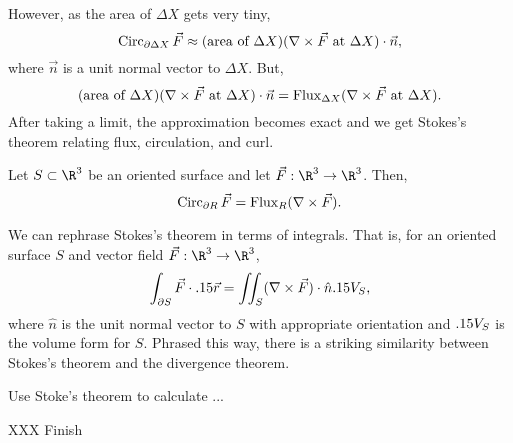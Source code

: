 However, as the area of $\Delta X$ gets very tiny,
\[
	\operatorname{Circ}_{\partial \Delta X} \vec F \approx (\text{area of }\Delta X)(\nabla \times \vec F
	\text{ at }\Delta X)\cdot \vec n,
\]
where $\vec n$ is a unit normal vector to $\Delta X$.  But, 
\[ 
	(\text{area of }\Delta X)(\nabla \times \vec F
	\text{ at }\Delta X)\cdot \vec n = \operatorname{Flux}_{\Delta X}(\nabla \times \vec F\text{ at }\Delta X).
\]
After taking a limit, the approximation becomes exact and we get Stokes's theorem
relating flux, circulation, and curl.

\begin{theorem}
	Let $S\subset \R^3$ be an oriented surface and let $\vec F:\R^3\to\R^3$.  Then,
	\[
		\operatorname{Circ}_{\partial R} \vec F = \operatorname{Flux}_{R}(\nabla \times \vec F).
	\]
\end{theorem}

We can rephrase Stokes's theorem in terms of integrals.  That is, for an oriented
surface $S$ and vector field $\vec F:\R^3\to\R^3$,
\[
	\int_{\partial S} \vec F\cdot .15\vec r = \iint_S (\nabla \times \vec F)\cdot
	\hat n.15 V_S,
\]
where $\hat n$ is the unit normal vector to $S$ with appropriate orientation and 
$.15 V_S$ is the volume form for $S$.  Phrased this way, there is a striking similarity
between Stokes's theorem and the divergence theorem.

\begin{example}
	Use Stoke's theorem to calculate ...

	XXX Finish
\end{example}



